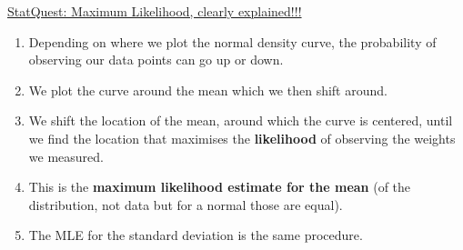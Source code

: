 \documentclass[12pt, titlepage, french]{report}
\begin{document}
\begin{YTB_SUMM}{\href{https://www.youtube.com/watch?v=XepXtl9YKwc&feature=youtu.be}{StatQuest: Maximum Likelihood, clearly explained!!!}}
\begin{enumerate}
	\item	Depending on where we plot the normal density curve, the probability of observing our data points can go up or down.
	\item	We plot the curve around the mean which we then shift around.
	\item	We shift the location of the mean, around which the curve is centered, until we find the location that maximises the \textbf{likelihood} of observing the weights we measured.
	\item[]	This is the \textbf{maximum likelihood estimate for the mean} (of the distribution, not data but for a normal those are equal).	
	\item	The MLE for the standard deviation is the same procedure.
\end{enumerate}


\begin{tikzpicture}[x=0.75pt,y=0.75pt,yscale=-1,xscale=1]


\end{tikzpicture}
\end{YTB_SUMM}
\end{document}

